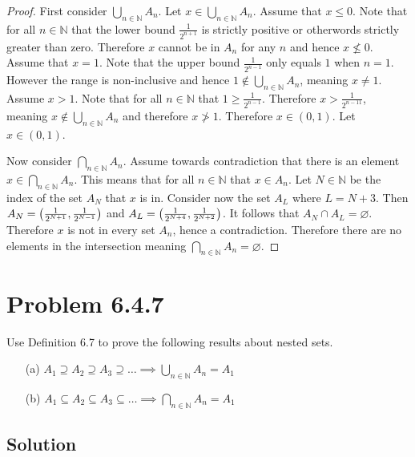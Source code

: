 \documentclass[12pt]{extarticle}
\begin{document}
\begin{proof}
		First consider $\bigcup_{n \in \mathbb{N}} A_n$. Let $x \in \bigcup_{n \in \mathbb{N}} A_n$. Assume that $x \leq 0$. Note that for all $n \in \mathbb{N}$ that the lower bound $\frac{1}{2^{n+1}}$ is strictly positive or otherwords strictly greater than zero. Therefore $x$ cannot be in $A_n$ for any $n$ and hence $x \nleq 0$. Assume that $x = 1$. Note that the upper bound $\frac{1}{2^{n-1}}$ only equals $1$ when $n = 1$. However the range is non-inclusive and hence $1 \notin \bigcup_{n \in \mathbb{N}} A_n$, meaning $x \neq 1$. Assume $x > 1$. Note that for all $n \in \mathbb{N}$ that $1 \geq \frac{1}{2^{n-1}}$. Therefore $x > \frac{1}{2^{n-11}}$, meaning $x \notin \bigcup_{n \in \mathbb{N}} A_n$ and therefore $x \ngtr 1$. Therefore $x \in (0,1)$. Let $x \in (0,1)$.

		\hfill\linebreak

		Now consider $\bigcap_{n \in \mathbb{N}} A_n$. Assume towards contradiction that there is an element $x \in \bigcap_{n \in \mathbb{N}} A_n$. This means that for all $n \in \mathbb{N}$ that $x \in A_n$. Let $N \in \mathbb{N}$ be the index of the set $A_N$ that $x$ is in. Consider now the set $A_L$ where $L = N + 3$. Then $A_N = \qty(\frac{1}{2^{N+1}}, \frac{1}{2^{N-1}})$ and $A_L = \qty(\frac{1}{2^{N+4}}, \frac{1}{2^{N+2}})$. It follows that $A_N \cap A_L = \varnothing$. Therefore $x$ is not in every set $A_n$, hence a contradiction. Therefore there are no elements in the intersection meaning $\bigcap_{n \in \mathbb{N}} A_n = \varnothing$.
\end{proof}

\section*{Problem 6.4.7}

Use Definition 6.7 to prove the following results about nested sets.

\begin{enumerate}
	\item[(a)] $A_1 \supseteq A_2 \supseteq A_3 \supseteq\ldots \implies \bigcup\limits_{n \in \mathbb{N}} A_n = A_1 $
	\item[(b)] $A_1 \subseteq A_2 \subseteq A_3 \subseteq\ldots \implies \bigcap\limits_{n \in \mathbb{N}} A_n = A_1 $
\end{enumerate}

\subsection*{Solution}
\end{document}
